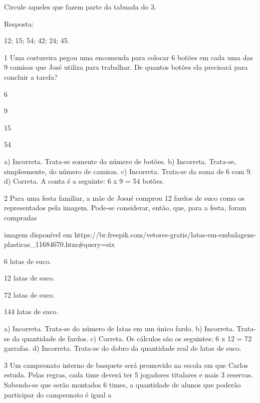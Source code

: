 \begin{escolha}
Circule aqueles que fazem parte da tabuada do 3.

Resposta:

12; 15; 54; 42; 24; 45.


\num{1} Uma costureira pegou uma encomenda para colocar 6 botões em
cada uma das 9 camisas que José utiliza para trabalhar. De quantos botões
ela precisará para concluir a tarefa?

\begin{escolha}
    \item 6
    \item 9
    \item 15
    \item 54
\end{escolha}

a) Incorreta. Trata-se somente do número de botões.
b) Incorreta. Trata-se, simplesmente, do número de camisas.
c) Incorreta. Trata-se da soma de 6 com 9.
d) Correta. A conta é a seguinte: 6 x 9 = 54 botões.

\num{2} Para uma festa familiar, a mãe de Josué comprou 12 fardos de
suco como os representados pela imagem. Pode-se considerar, então, que, para a festa, foram compradas

\Incluir imagem disponível em https://br.freepik.com/vetores-gratis/latas-em-embalagens-plasticas_11684670.htm#query=six%

\begin{escolha}

\item
  6 latas de suco.
\item
  12 latas de suco.
\item
  72 latas de suco.
\item
  144 latas de suco.
\end{escolha}

a) Incorreta. Trata-se do número de latas em um único fardo.
b) Incorreta. Trata-se da quantidade de fardos.
c) Correta. Os cálculos são os seguintes: 6 x 12 = 72 garrafas.
d) Incorreta. Trata-se do dobro da quantidade real de latas de suco.



\num{3} Um campeonato interno de basquete será promovido na escola em que Carlos
estuda. Pelas regras, cada time deverá ter 5 jogadores titulares e mais 3 reservas. Sabendo-se que serão montados 6 times, a quantidade de alunos
que poderão participar do campeonato é igual a


\end{escolha}
